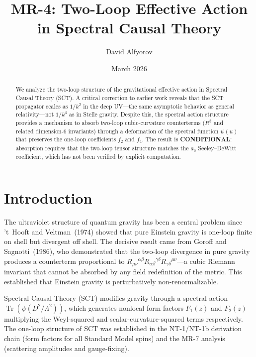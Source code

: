 \documentclass[12pt,a4paper]{article}
\title{\textbf{MR-4: Two-Loop Effective Action\\in Spectral Causal Theory}}
\author{David Alfyorov}
\date{March 2026}
\newcommand{\Tr}{\operatorname{Tr}}
\begin{document}
\maketitle
\begin{center}
\end{center}

\begin{abstract}
We analyze the two-loop structure of the gravitational effective action
in Spectral Causal Theory (SCT). A critical correction to earlier work
reveals that the SCT propagator scales as $1/k^2$ in the deep UV---the
same asymptotic behavior as general relativity---not $1/k^4$ as in Stelle
gravity. Despite this, the spectral action structure provides a mechanism
to absorb two-loop cubic-curvature counterterms ($R^3$ and related
dimension-6 invariants) through a deformation of the spectral function
$\psi(u)$ that preserves the one-loop coefficients $f_2$ and $f_4$.
The result is \textbf{CONDITIONAL}: absorption requires that the two-loop
tensor structure matches the $a_6$ Seeley--DeWitt coefficient, which has
not been verified by explicit computation.
\end{abstract}

\tableofcontents
\newpage

\section{Introduction}
\label{sec:intro}

The ultraviolet structure of quantum gravity has been a central problem
since 't~Hooft and Veltman~(1974) showed that pure Einstein gravity is
one-loop finite on shell but divergent off shell. The decisive result
came from Goroff and Sagnotti~(1986), who demonstrated that the two-loop
divergence in pure gravity produces a counterterm proportional to
$R_{\mu\nu}{}^{\alpha\beta} R_{\alpha\beta}{}^{\gamma\delta}
R_{\gamma\delta}{}^{\mu\nu}$---a cubic Riemann invariant that cannot
be absorbed by any field redefinition of the metric. This established
that Einstein gravity is perturbatively non-renormalizable.

Spectral Causal Theory (SCT) modifies gravity through a spectral action
$\Tr(\psi(D^2/\Lambda^2))$, which generates nonlocal form factors
$F_1(z)$ and $F_2(z)$ multiplying the Weyl-squared and scalar-curvature-squared
terms respectively. The one-loop structure of SCT was established in
the NT-1/NT-1b derivation chain (form factors for all Standard Model spins)
and the MR-7 analysis (scattering amplitudes and gauge-fixing).
\end{document}
